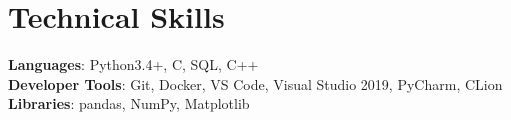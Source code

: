 \documentclass[../main.tex]{subfiles}
\begin{document}
    
\section{Technical Skills}
 \begin{itemize}[leftmargin=0.15in, label={}]
    \small{\item{
     \textbf{Languages}{: Python3.4+, C, SQL, C++} \\
     \textbf{Developer Tools}{: Git, Docker, VS Code, Visual Studio 2019, PyCharm, CLion} \\
     \textbf{Libraries}{: pandas, NumPy, Matplotlib}
    }}
 \end{itemize}
\end{document}

